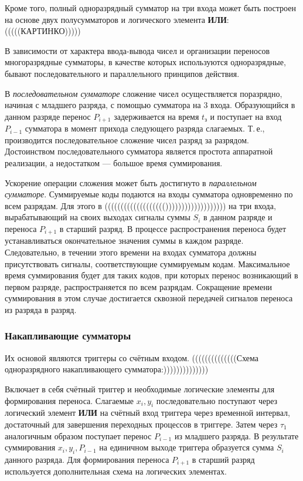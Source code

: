 \documentclass[10pt,a4paper,titlepage]{article}
\begin{document}
Кроме того, полный одноразрядный сумматор на три входа может быть построен на основе двух полусумматоров и логического элемента \textbf{ИЛИ}:(((((КАРТИНКО)))))

В зависимости от характера ввода-вывода чисел и организации переносов многоразрядные сумматоры, в качестве которых используются одноразрядные, бывают последовательного и параллельного принципов действия.

В \textit{последовательном сумматоре} сложение чисел осуществляется поразрядно, начиная с младшего разряда, с помощью сумматора на 3 входа.
Образующийся в данном разряде перенос $P_{i+1}$ задерживается на время $t_{з}$ и поступает на вход $P_{i-1}$ сумматора в момент прихода следующего разряда слагаемых.
Т.\,е., производится последовательное сложение чисел разряд за разрядом.
Достоинством последовательного сумматора является простота аппаратной реализации, а недостатком --- большое время суммирования.

Ускорение операции сложения может быть достигнуто в \textit{параллельном сумматоре}.
Суммируемые коды подаются на входы сумматора одновременно по всем разрядам.
Для этого в ((((((((((((((((((())))))))))))))))))) на три входа, вырабатывающий на своих выходах сигналы суммы $S_i$ в данном разряде и переноса $P_{i+1}$ в старший разряд.
В процессе распространения переноса будет устанавливаться окончательное значения суммы в каждом разряде.
Следовательно, в течении этого времени на входах сумматора должны присутствовать сигналы, соответствующие суммируемым кодам.
Максимальное время суммирования будет для таких кодов, при которых перенос возникающий в первом разряде, распространяется по всем разрядам.
Сокращение времени суммирования в этом случае достигается сквозной передачей сигналов переноса из разряда в разряд.
\subsubsection{Накапливающие сумматоры}
Их основой являются триггеры со счётным входом. ((((((((((((((Схема одноразрядного накапливающего сумматора:))))))))))))))

Включает в себя счётный триггер и необходимые логические элементы для формирования переноса.
Слагаемые $x_i,y_i$ последовательно поступают через логический элемент \textbf{ИЛИ} на счётный вход триггера через временной интервал, достаточный для завершения переходных процессов в триггере.
Затем через $\tau_1$ аналогичным образом поступает перенос $P_{i-1}$ из младшего разряда.
В результате суммирования $x_i,y_i,P_{i-1}$ на единичном выходе триггера образуется сумма $S_i$ данного разряда.
Для формирования переноса $P_{i+1}$ в старший разряд используется дополнительная схема на логических элементах.
\end{document}
